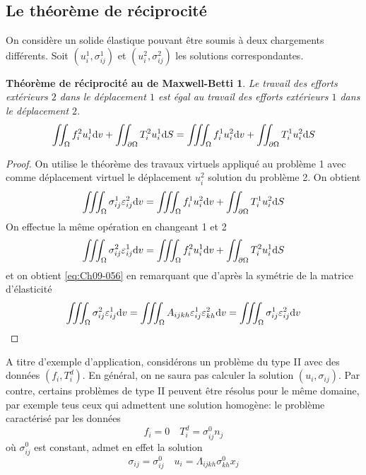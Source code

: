 \subsection{Le théorème de réciprocité} \label{ssec:Ch09-2.1}
On considère un solide élastique pouvant être soumis à deux chargements différents.
Soit $\left( u_i^1, \sigma_{ij}^1 \right)$ et $\left( u_i^2, \sigma_{ij}^2 \right)$ les solutions correspondantes.

\newtheorem*{ThMB}{Théorème de réciprocité au de Maxwell-Betti}
\begin{ThMB}
    Le travail des efforts extérieurs $2$ dans le déplacement $1$ est égal au travail des efforts extérieurs $1$ dans le déplacement $2$.
    \begin{equation}
        \iint_{\Omega} f_i^2 u_i^1 \mathrm{d} v + \iint_{\partial \Omega} T_i^2 u_i^1 \mathrm{d} S = \iiint_{\Omega} f_i^1 u_i^2 \mathrm{d} v + \iint_{\partial \Omega} T_i^1 u_i^2 \mathrm{d} S
        \label{eq:Ch09-056}
    \end{equation}
\end{ThMB}
\begin{proof}
    On utilise le théorème des travaux virtuels appliqué au problème 1 avec comme déplacement virtuel le déplacement $u_i^2$ solution du problème 2. 
    On obtient
    \begin{displaymath}
        \iiint_{\Omega} \sigma_{ij}^1 \varepsilon_{ij}^2 \mathrm{d} v = \iiint_{\Omega} f_i^1 u_i^2 \mathrm{d} v + \iint_{\partial \Omega} T_i^1 u_i^2 \mathrm{d} S
    \end{displaymath}
    On effectue la même opération en changeant 1 et 2 
    \begin{displaymath}
        \iiint_{\Omega} \sigma_{ij}^2 \varepsilon_{ij}^1 \mathrm{d} v = \iiint_{\Omega} f_i^2 u_i^1 \mathrm{d} v + \iint_{\partial \Omega} T_i^2 u_i^1 \mathrm{d} S
    \end{displaymath}
    et on obtient \eqref{eq:Ch09-056} en remarquant que d'après la symétrie de la matrice d'élasticité 
    \begin{displaymath}
        \iiint_{\Omega} \sigma_{ij}^2 \varepsilon_{ij}^1 \mathrm{d} v = \iiint_{\Omega} A_{ijkh} \varepsilon_{ij}^1 \varepsilon_{kh}^2 \mathrm{d} v = \iiint_{\Omega} \sigma_{ij}^1 \varepsilon_{ij}^2 \mathrm{d} v
    \end{displaymath}
\end{proof}

A titre d'exemple d'application, considérons un problème du type II avec des données $\left( f_i, T_i^d \right)$.
En général, on ne saura pas calculer la solution $\left( u_i, \sigma_{ij} \right)$.
Par contre, certains problèmes de type II peuvent être résolus pour le même domaine, par exemple teus ceux qui admettent une solution homogène: le problème caractérisé par les données 
\begin{equation}
    f_i = 0 \quad T_i^d = \sigma_{ij}^0 n_j
    \label{eq:Ch09-057}
\end{equation}
où $\sigma_{ij}^0$ est constant, admet en effet la solution 
\begin{equation}
    \sigma_{ij} = \sigma_{ij}^0 \quad u_i = \Lambda_{ijkh} \sigma_{kh}^0 x_j
    \label{eq:Ch09-058}
\end{equation}

